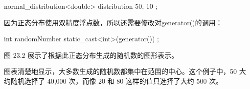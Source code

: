 \begin{cpp}
normal_distribution<double> distribution { 50, 10 };
\end{cpp}

因为正态分布使用双精度浮点数，所以还需要修改对generator()的调用：

\begin{cpp}
int randomNumber { static_cast<int>(generator()) };
\end{cpp}

图 23.2 展示了根据此正态分布生成的随机数的图形表示。


图表清楚地显示，大多数生成的随机数都集中在范围的中心。这个例子中，50 大约随机选择了 40,000 次，而像 20 和 80 这样的值只选择了大约 500 次。


















